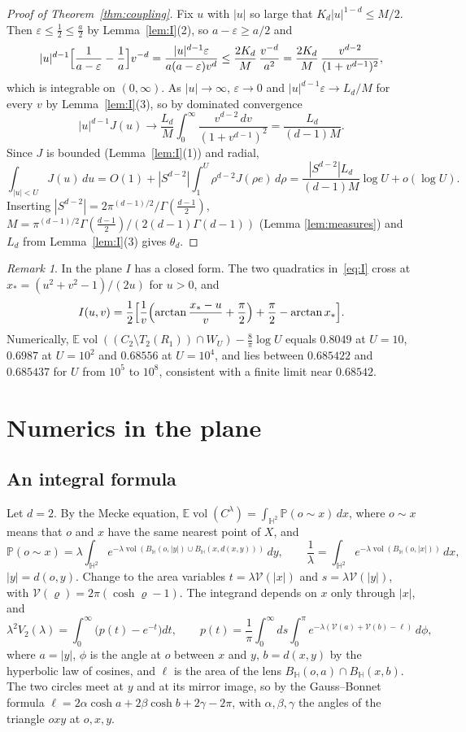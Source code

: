 \documentclass[11pt]{amsart}
\theoremstyle{remark}
\newtheorem{remark}[theorem]{Remark}
\newcommand{\HH}{\mathbb{H}}
\newcommand{\E}{\mathbb{E}}
\newcommand{\Prob}{\mathbb{P}}
\newcommand{\vol}{\operatorname{vol}}
\begin{document}
\begin{proof}[Proof of Theorem~\ref{thm:coupling}]
Fix $u$ with $|u|$ so large that $K_d|u|^{1-d}\le M/2$. Then $\varepsilon\le\frac12\le\frac a2$ by
Lemma~\ref{lem:I}(2), so $a-\varepsilon\ge a/2$ and
\[
|u|^{d-1}\Bigl[\frac1{a-\varepsilon}-\frac1a\Bigr]v^{-d}=\frac{|u|^{d-1}\varepsilon}{a(a-\varepsilon)v^d}\le
\frac{2K_d}M\,\frac{v^{-d}}{a^2}=\frac{2K_d}M\,\frac{v^{d-2}}{(1+v^{d-1})^2},
\]
which is integrable on $(0,\infty)$. As $|u|\to\infty$, $\varepsilon\to0$ and $|u|^{d-1}\varepsilon\to L_d/M$ for
every $v$ by Lemma~\ref{lem:I}(3), so by dominated convergence
\[
|u|^{d-1}J(u)\to\frac{L_d}M\int_0^\infty\frac{v^{d-2}\,dv}{(1+v^{d-1})^2}=\frac{L_d}{(d-1)M}.
\]
Since $J$ is bounded (Lemma~\ref{lem:I}(1)) and radial,
\[
\int_{|u|<U}J(u)\,du=O(1)+|S^{d-2}|\int_1^U\rho^{d-2}J(\rho e)\,d\rho=\frac{|S^{d-2}|L_d}{(d-1)M}\log U+o(\log U).
\]
Inserting $|S^{d-2}|=2\pi^{(d-1)/2}/\Gamma(\frac{d-1}2)$, $M=\pi^{(d-1)/2}\Gamma(\frac{d-1}2)/(2(d-1)\Gamma(d-1))$ (Lemma
\ref{lem:measures}) and $L_d$ from Lemma~\ref{lem:I}(3) gives $\theta_d$.
\end{proof}

\begin{remark}
In the plane $I$ has a closed form. The two quadratics in~\eqref{eq:I} cross at $x_*=(u^2+v^2-1)/(2u)$ for $u>0$,
and
\[
I(u,v)=\frac12\Bigl[\frac1v\Bigl(\arctan\frac{x_*-u}v+\frac\pi2\Bigr)+\frac\pi2-\arctan x_*\Bigr].
\]
Numerically, $\E\vol((C_2\setminus T_2(R_1))\cap W_U)-\frac8\pi\log U$ equals $0.8049$ at $U=10$, $0.6987$ at
$U=10^2$ and $0.68556$ at $U=10^4$, and lies between $0.685422$ and $0.685437$ for $U$ from $10^5$ to $10^8$,
consistent with a finite limit near $0.68542$.
\end{remark}

\section{Numerics in the plane}\label{sec:numerics}

\subsection{An integral formula}
Let $d=2$. By the Mecke equation, $\E\vol(C^\lambda)=\int_{\HH^2}\Prob(o\sim x)\,dx$, where $o\sim x$ means that $o$ and
$x$ have the same nearest point of $X$, and
\[
\Prob(o\sim x)=\lambda\int_{\HH^2}e^{-\lambda\vol(B_\HH(o,|y|)\cup B_\HH(x,d(x,y)))}\,dy,\qquad
\frac1\lambda=\int_{\HH^2}e^{-\lambda\vol(B_\HH(o,|x|))}\,dx ,
\]
$|y|=d(o,y)$. Change to the area variables $t=\lambda\mathcal V(|x|)$ and $s=\lambda\mathcal V(|y|)$, with
$\mathcal V(\varrho)=2\pi(\cosh\varrho-1)$. The integrand depends on $x$ only through $|x|$, and
\[
\lambda^2V_2(\lambda)=\int_0^\infty\bigl(p(t)-e^{-t}\bigr)dt,\qquad p(t)=\frac1\pi\int_0^\infty ds\int_0^\pi
e^{-\lambda(\mathcal V(a)+\mathcal V(b)-\ell)}\,d\phi ,
\]
where $a=|y|$, $\phi$ is the angle at $o$ between $x$ and $y$, $b=d(x,y)$ by the hyperbolic law of cosines, and $\ell$
is the area of the lens $B_\HH(o,a)\cap B_\HH(x,b)$. The two circles meet at $y$ and at its mirror image, so by the
Gauss--Bonnet formula $\ell=2\alpha\cosh a+2\beta\cosh b+2\gamma-2\pi$, with $\alpha,\beta,\gamma$ the angles of the
triangle $oxy$ at $o,x,y$.
\end{document}
